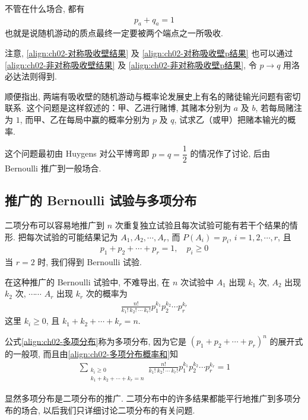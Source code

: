 \documentclass[../../main.tex]{subfiles}
\begin{document}
不管在什么场合, 都有
\begin{align*}
p_a+q_a=1
\end{align*}
也就是说随机游动的质点最终一定要被两个端点之一所吸收.

注意, \eqref{align:ch02-对称吸收壁结果} 及 \eqref{align:ch02-对称吸收壁p结果} 也可以通过 \eqref{align:ch02-非对称吸收壁结果} 及 \eqref{align:ch02-非对称吸收壁p结果}, 令 $p\to q$ 用洛必达法则得到.

顺便指出, 两端有吸收壁的随机游动与概率论发展史上有名的赌徒输光问题有密切联系. 这个问题是这样叙述的：甲、乙进行赌博, 其赌本分别为 $a$ 及 $b$, 若每局赌注为 $1$, 而甲、乙在每局中赢的概率分别为 $p$ 及 $q$, 试求乙（或甲）把赌本输光的概率.

这个问题最初由 Huygens 对公平博弯即 $p=q=\dfrac{1}{2}$ 的情况作了讨论, 后由 Bernoulli 推广到一般场合.

\subsection{推广的 Bernoulli 试验与多项分布}

二项分布可以容易地推广到 $n$ 次重复独立试验且每次试验可能有若干个结果的情形. 把每次试验的可能结果记为 $A_1, A_2, \cdots, A_r$, 而 $P(A_i)=p_i$, $i=1,2,\cdots,r$, 且
\begin{align}\label{align:ch02-多项分布概率和}
p_1+p_2+\cdots+p_r=1,\quad p_i\geqslant 0
\end{align}
当 $r=2$ 时, 我们得到 Bernoulli 试验.

在这种推广的 Bernoulli 试验中, 不难导出, 在 $n$ 次试验中 $A_1$ 出现 $k_1$ 次, $A_2$ 出现 $k_2$ 次, $\cdots\cdots$ $A_r$ 出现 $k_r$ 次的概率为
\begin{align}\label{align:ch02-多项分布}
\frac{n!}{k_1!\ k_2!\ \cdots\ k_r!}p_1^{k_1}p_2^{k_2}\cdots p_r^{k_r}
\end{align}
这里 $k_i\geqslant 0$, 且 $k_1+k_2+\cdots+k_r=n$.

公式\eqref{align:ch02-多项分布}称为多项分布, 因为它是 $(p_1+p_2+\cdots+p_r)^n$ 的展开式的一般项, 而且由\eqref{align:ch02-多项分布概率和}知
\begin{align*}
\sum_{\substack{k_i\geqslant 0\\ k_1+k_2+\cdots+k_r=n}}\frac{n!}{k_1!\ k_2!\ \cdots\ k_r!}p_1^{k_1}p_2^{k_2}\cdots p_r^{k_r}=1
\end{align*}

显然多项分布是二项分布的推广. 二项分布中的许多结果都能平行地推广到多项分布的场合, 以后我们只详细讨论二项分布的有关问题.
\end{document}
